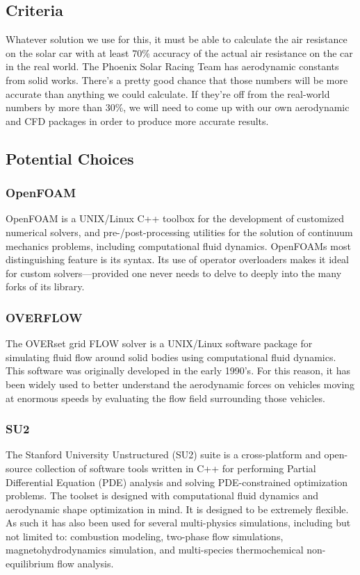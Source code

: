 \documentclass[onecolumn, draftclsnofoot,10pt, compsoc]{IEEEtran}
\begin{document}
\begin{singlespace}
\subsection{Criteria}
Whatever solution we use for this, it must be able to calculate the air resistance on the solar car with at least 70\% accuracy of the actual air resistance on the car in the real world.
The Phoenix Solar Racing Team has aerodynamic constants from solid works.
There's a pretty good chance that those numbers will be more accurate than anything we could calculate.
If they're off from the real-world numbers by more than 30\%, we will need to come up with our own aerodynamic and CFD packages in order to produce more accurate results.

\subsection{Potential Choices}

\subsubsection{OpenFOAM}
OpenFOAM is a UNIX/Linux C++ toolbox for the development of customized numerical solvers, and pre-/post-processing utilities for the solution of continuum mechanics problems, including computational fluid dynamics.
OpenFOAMs most distinguishing feature is its syntax.
Its use of operator overloaders makes it ideal for custom solvers---provided one never needs to delve to deeply into the many forks of its library.
\cite{OpenFOAM}

\subsubsection{OVERFLOW}
The OVERset grid FLOW solver is a UNIX/Linux software package for simulating fluid flow around solid bodies using computational fluid dynamics.
This software was originally developed in the early 1990's.
For this reason, it has been widely used to better understand the aerodynamic forces on vehicles moving at enormous speeds by evaluating the flow field surrounding those vehicles.
\cite{OVERFLOW}

\subsubsection{SU2}
The Stanford University Unstructured (SU2) suite is a cross-platform and open-source collection of software tools written in C++ for performing Partial Differential Equation (PDE) analysis and solving PDE-constrained optimization problems.
The toolset is designed with computational fluid dynamics and aerodynamic shape optimization in mind.
It is designed to be extremely flexible.
As such it has also been used for several multi-physics simulations, including but not limited to: combustion modeling, two-phase flow simulations, magnetohydrodynamics simulation, and multi-species thermochemical non-equilibrium flow analysis.
\cite{SU2}


\end{singlespace}
\end{document}
